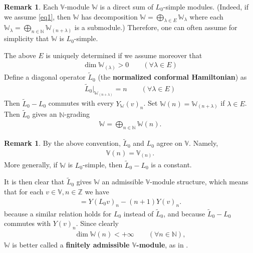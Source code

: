 \documentclass[11pt,b5paper,notitlepage]{article}
\theoremstyle{definition}
\newtheorem{rem}[df]{Remark}
\theoremstyle{plain}
\newcommand{\wtd}{\widetilde}
\newcommand{\Vbb}{\mathbb V}
\newcommand{\Wbb}{\mathbb W}
\newcommand{\Nbb}{\mathbb N}
\newcommand{\Zbb}{\mathbb Z}
\numberwithin{equation}{section}
\begin{document}
\begin{rem}
Each $\Vbb$-module $\Wbb$ is a direct sum of $L_0$-simple modules. (Indeed, if we assume \eqref{eq1}, then $\Wbb$ has decomposition $\Wbb=\bigoplus_{\lambda\in E}\Wbb_\lambda$ where each $\Wbb_\lambda=\bigoplus_{n\in\Nbb}\Wbb_{(n+\lambda)}$ is a submodule.) Therefore, one can often assume for simplicity that $\Wbb$ is $L_0$-simple.
\end{rem}




The above $E$ is uniquely determined if we assume moreover that
\begin{align*}
\dim \Wbb_{(\lambda)}>0\qquad(\forall\lambda\in E)
\end{align*}
Define a diagonal operator $\wtd L_0$ \index{L0@$\wtd L_0$} (the \textbf{normalized conformal Hamiltonian}) as
\begin{align*}
\wtd L_0\big|_{\Wbb_{(n+\lambda)}}=n\qquad(\forall \lambda\in E)
\end{align*}
Then $\wtd L_0-L_0$ commutes with every $Y_\Wbb(v)_n$. Set $\Wbb(n)=\Wbb_{(n+\lambda)}$ \index{Wn@$\Wbb_s,\Wbb(n)$} if $\lambda\in E$. Then $\wtd L_0$ gives an $\Nbb$-grading
\begin{align*}
\Wbb=\bigoplus_{n\in\Nbb}\Wbb(n).
\end{align*}


\begin{rem}
By the above convention, $\wtd L_0$ and $L_0$ agree on $\Vbb$. Namely,
\begin{align*}
\Vbb(n)=\Vbb_{(n)}.
\end{align*}
More generally, if $\Wbb$ is $L_0$-simple, then $\wtd L_0-L_0$ is a constant.
\end{rem}

It is then clear that $\wtd L_0$ gives $\Wbb$ an admissible $\Vbb$-module structure, which means that for each $v\in\Vbb,n\in\Zbb$ we have
\begin{align*}
[\wtd L_0,Y(v)_n]=Y(L_0 v)_n-(n+1)Y(v)_n.
\end{align*}
because a similar relation holds for $L_0$ instead of $\wtd L_0$, and because $\wtd L_0-L_0$ commutes with $Y(v)_n$. Since clearly
\begin{align*}
\dim\Wbb(n)<+\infty\qquad(\forall n\in\Nbb),
\end{align*}
$\Wbb$ is better called a \textbf{finitely admissible $\Vbb$-module}, as in \cite{Gui23a}.
\end{document}
